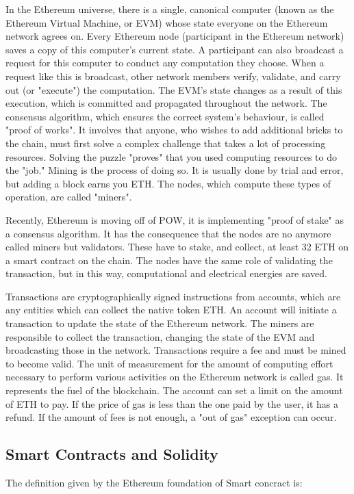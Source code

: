 \documentclass[a4paper,sigconf, language=french,
language=german, language=spanish, language=english]{acmart}
\begin{document}
In the Ethereum universe, there is a single, canonical computer (known as the Ethereum Virtual Machine, or EVM) whose state everyone on the Ethereum network agrees on. 
Every Ethereum node (participant in the Ethereum network) saves a copy of this computer's current state. 
A participant can also broadcast a request for this computer to conduct any computation they choose. 
When a request like this is broadcast, other network members verify, validate, and carry out (or "execute") the computation. 
The EVM's state changes as a result of this execution, which is committed and propagated throughout the network. The consensus algorithm, which ensures the correct system's behaviour, is called "proof of works". 
It involves that anyone, who wishes to add additional bricks to the chain, must first solve a complex challenge that takes a lot of processing resources.
Solving the puzzle "proves" that you used computing resources to do the "job."
Mining is the process of doing so. It is usually done by trial and error, but adding a block earns you ETH. The nodes, which compute these types of operation, are called "miners".

Recently, Ethereum is moving off of POW, it is implementing "proof of stake" as a consensus algorithm. It has the consequence that the nodes are no anymore called miners but validators. These have to stake, and collect, at least 32 ETH on a smart contract on the chain. The nodes have the same role of validating the transaction, but in this way, computational and electrical energies are saved.

Transactions are cryptographically signed instructions from accounts, which are any entities which can collect the native token ETH. An account will initiate a transaction to update the state of the Ethereum network. 
The miners are responsible to collect the transaction, changing the state of the EVM and broadcasting those in the network. Transactions require a fee and must be mined to become valid. 
The unit of measurement for the amount of computing effort necessary to perform various activities on the Ethereum network is called gas. It represents the fuel of the blockchain. 
The account can set a limit on the amount of ETH to pay. If the price of gas is less than the one paid by the user, it has a refund. If the amount of fees is not enough, a "out of gas" exception can occur.



\subsection{Smart Contracts and Solidity}
The definition given by the Ethereum foundation of Smart concract is:
\end{document}
